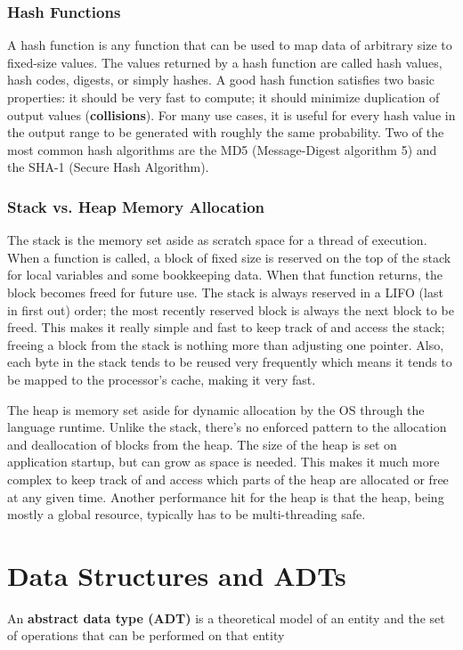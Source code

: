 \documentclass{article}
\begin{document}
    \subsubsection{Hash Functions}
        A hash function is any function that can be used to map data of arbitrary size to fixed-size values. The values returned by a hash function are called hash values, hash codes, digests, or simply hashes. 
        A good hash function satisfies two basic properties: it should be very fast to compute; it should minimize duplication of output values (\textbf{collisions}). For many use cases, it is useful for every hash value in the output range to be generated with roughly the same probability. Two of the most common hash algorithms are the MD5 (Message-Digest algorithm 5) and the SHA-1 (Secure Hash Algorithm).

    \subsubsection{Stack vs. Heap Memory Allocation}
    The stack is the memory set aside as scratch space for a thread of execution. When a function is called, a block of fixed size is reserved on the top of the stack for local variables and some bookkeeping data. When that function returns, the block becomes freed for future use. The stack is always reserved in a LIFO (last in first out) order; the most recently reserved block is always the next block to be freed. This makes it really simple and fast to keep track of and access the stack; freeing a block from the stack is nothing more than adjusting one pointer. Also, each byte in the stack tends to be reused very frequently which means it tends to be mapped to the processor's cache, making it very fast.

    The heap is memory set aside for dynamic allocation by the OS through the language runtime. Unlike the stack, there's no enforced pattern to the allocation and deallocation of blocks from the heap. The size of the heap is set on application startup, but can grow as space is needed. This makes it much more complex to keep track of and access which parts of the heap are allocated or free at any given time. Another performance hit for the heap is that the heap, being mostly a global resource, typically has to be multi-threading safe.

\newpage
\section{Data Structures and ADTs}
    An \textbf{abstract data type (ADT)} is a theoretical model of an entity and the set of operations that can be performed on that entity
    
\end{document}
